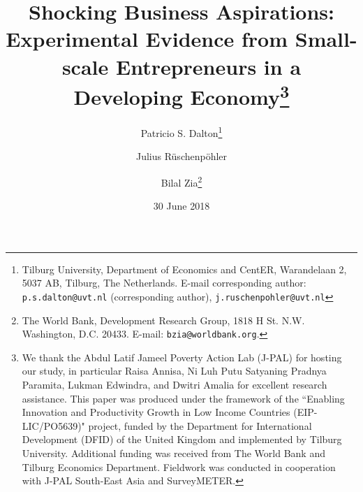 \documentclass[11.5pt]{article}
\begin{document}
\title{\Large \textbf{Shocking Business Aspirations: \\
Experimental Evidence from Small-scale Entrepreneurs in a Developing Economy}\thanks {\scriptsize We thank the Abdul Latif Jameel Poverty Action Lab (J-PAL) for hosting our study, in particular Raisa Annisa, Ni Luh Putu Satyaning Pradnya Paramita, Lukman Edwindra, and Dwitri Amalia for excellent research assistance. This paper was produced under the framework of the \textquotedblleft Enabling Innovation and Productivity Growth in Low Income Countries (EIP-LIC/PO5639)" project, funded by the Department for International Development (DFID) of the United Kingdom and implemented by Tilburg University. Additional funding was received from The World Bank and Tilburg Economics Department. Fieldwork was conducted in cooperation with J-PAL South-East Asia and SurveyMETER.}}

\author{Patricio S. Dalton\thanks{\scriptsize Tilburg University, Department of Economics and CentER, Warandelaan 2, 5037 AB, Tilburg, The Netherlands. E-mail corresponding author: \texttt{p.s.dalton@uvt.nl} (corresponding author), \texttt{j.ruschenpohler@uvt.nl}}
\and Julius R\"uschenp\"ohler\footnotemark[2]
\and Bilal Zia\thanks{\scriptsize The World Bank, Development Research Group, 1818 H St. N.W. Washington, D.C. 20433. E-mail: \texttt{bzia@worldbank.org}.}}


\date{30 June 2018}
\maketitle
\singlespace
\end{document}
